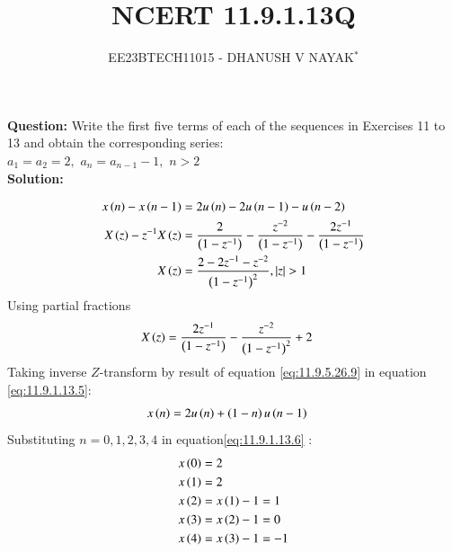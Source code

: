 \documentclass[journal,12pt,twocolumn]{IEEEtran}
\theoremstyle{remark}
\begin{document}

\title{NCERT 11.9.1.13Q}
\author{EE23BTECH11015 - DHANUSH V NAYAK$^{*}$%
}
\maketitle
\newpage
\bigskip
\renewcommand{\thefigure}{\arabic{figure}}
\renewcommand{\thetable}{\theenumi}
\textbf{Question:} Write the first five terms of each of the sequences in Exercises 11 to 13 and obtain the corresponding series:\\
$a_1=a_2=2,$\hspace{5pt} $a_n=a_{n-1} -1,$\hspace{5pt} $n>2$\\
\textbf{Solution:}

\begin{align}
    x\left(n\right) - x\left(n-1\right) &= 2u\left(n\right)-2u\left(n-1\right)-u\left(n-2\right)\label{eq:11.9.1.13.1}\\
X\left(z\right)- z^{-1}X\left(z\right) &= \frac{2}{\left(1-z^{-1}\right)} - \frac{z^{-2}}{\left(1-z^{-1}\right)}- \frac{2z^{-1}}{\left(1-z^{-1}\right)}\\
    X\left(z\right) &= \frac{2-2z^{-1}-z^{-2}}{\left(1-z^{-1}\right)^2}  ,   \left\vert z\right\vert >1
\end{align}
Using partial fractions
\begin{align}
    X\left(z\right) &= \frac{2z^{-1}}{\left(1-z^{-1}\right)} - \frac{z^{-2}}{\left(1-z^{-1}\right)^2} + 2\label{eq:11.9.1.13.5}
\end{align}
Taking inverse $Z$-transform by result of equation \eqref{eq:11.9.5.26.9} in equation \eqref{eq:11.9.1.13.5}:
\begin{align}
    x\left(n\right) &= 2u\left(n\right)+\left(1-n\right)u\left(n-1\right)\label{eq:11.9.1.13.6}
\end{align}
Substituting $n=0,1,2,3,4$ in equation\eqref{eq:11.9.1.13.6} :
\begin{align}
    x\left(0\right) &= 2\\
    x\left(1\right) &= 2\\
    x\left(2\right) &= x\left(1\right) - 1 = 1  \\
    x\left(3\right) &= x\left(2\right) - 1 = 0\\
    x\left(4\right) &= x\left(3\right) - 1 = -1 
\end{align}
\end{document}
